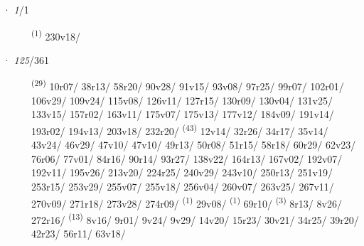 \noindent{} · \textit{1}/1 \LEMMALINE
\begin{description}
    \item[]  \textsuperscript{(1)} \mbox{230v18/}
\end{description}
\ENTRYEND
\noindent{} · \textit{125}/361 \LEMMALINE
\begin{description}
    \item[]  \textsuperscript{(29)} \mbox{10r07/} \mbox{38r13/} \mbox{58r20/} \mbox{90v28/} \mbox{91v15/} \mbox{93v08/} \mbox{97r25/} \mbox{99r07/} \mbox{102r01/} \mbox{106v29/} \mbox{109v24/} \mbox{115v08/} \mbox{126v11/} \mbox{127r15/} \mbox{130r09/} \mbox{130v04/} \mbox{131v25/} \mbox{133v15/} \mbox{157r02/} \mbox{163v11/} \mbox{175v07/} \mbox{175v13/} \mbox{177v12/} \mbox{184v09/} \mbox{191v14/} \mbox{193r02/} \mbox{194v13/} \mbox{203v18/} \mbox{232r20/} \textsuperscript{(43)} \mbox{12v14/} \mbox{32r26/} \mbox{34r17/} \mbox{35v14/} \mbox{43v24/} \mbox{46v29/} \mbox{47v10/} \mbox{47v10/} \mbox{49r13/} \mbox{50r08/} \mbox{51r15/} \mbox{58r18/} \mbox{60r29/} \mbox{62v23/} \mbox{76r06/} \mbox{77v01/} \mbox{84r16/} \mbox{90r14/} \mbox{93r27/} \mbox{138v22/} \mbox{164r13/} \mbox{167v02/} \mbox{192v07/} \mbox{192v11/} \mbox{195v26/} \mbox{213v20/} \mbox{224r25/} \mbox{240v29/} \mbox{243v10/} \mbox{250r13/} \mbox{251v19/} \mbox{253r15/} \mbox{253v29/} \mbox{255v07/} \mbox{255v18/} \mbox{256v04/} \mbox{260v07/} \mbox{263v25/} \mbox{267v11/} \mbox{270v09/} \mbox{271r18/} \mbox{273v28/} \mbox{274r09/} \textsuperscript{(1)} \mbox{29v08/} \textsuperscript{(1)} \mbox{69r10/} \CASEBREAK {} \textsuperscript{(3)} \mbox{8r13/} \mbox{8v26/} \mbox{272r16/} \textsuperscript{(13)} \mbox{8v16/} \mbox{9r01/} \mbox{9v24/} \mbox{9v29/} \mbox{14v20/} \mbox{15r23/} \mbox{30v21/} \mbox{34r25/} \mbox{39r20/} \mbox{42r23/} \mbox{56r11/} \mbox{63v18/} 
\end{description}
